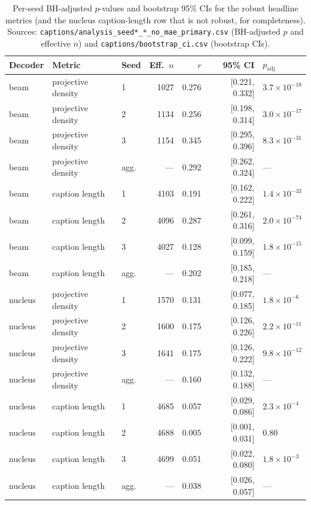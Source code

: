 \documentclass[11pt]{article}
\newcommand{\code}[1]{\texttt{#1}}
\begin{document}
\begin{table}[H]
\centering
\caption{Per-seed BH-adjusted \(p\)-values and bootstrap 95\% CIs for the
robust headline metrics (and the nucleus caption-length row that is not
robust, for completeness). Sources:
\code{captions/analysis\_seed*\_*\_no\_mae\_primary.csv} (BH-adjusted \(p\)
and effective \(n\)) and \code{captions/bootstrap\_ci.csv} (bootstrap CIs).}
\label{tab:per-seed-detail}
\footnotesize
\begin{tabular}{@{}l l l r r r l@{}}
\toprule
Decoder & Metric & Seed & Eff.\ \(n\) & \(r\) & 95\% CI & \(p_{\text{adj}}\) \\
\midrule
beam & projective density & 1 & 1027 & 0.276 & [0.221, 0.332] & \(3.7\!\times\!10^{-18}\) \\
beam & projective density & 2 & 1134 & 0.256 & [0.198, 0.314] & \(3.0\!\times\!10^{-17}\) \\
beam & projective density & 3 & 1154 & 0.345 & [0.295, 0.396] & \(8.3\!\times\!10^{-31}\) \\
beam & projective density & agg. & --- & 0.292 & [0.262, 0.324] & --- \\
\midrule
beam & caption length & 1 & 4103 & 0.191 & [0.162, 0.222] & \(1.4\!\times\!10^{-33}\) \\
beam & caption length & 2 & 4096 & 0.287 & [0.261, 0.316] & \(2.0\!\times\!10^{-74}\) \\
beam & caption length & 3 & 4027 & 0.128 & [0.099, 0.159] & \(1.8\!\times\!10^{-15}\) \\
beam & caption length & agg. & --- & 0.202 & [0.185, 0.218] & --- \\
\midrule
nucleus & projective density & 1 & 1570 & 0.131 & [0.077, 0.185] & \(1.8\!\times\!10^{-6}\) \\
nucleus & projective density & 2 & 1600 & 0.175 & [0.126, 0.226] & \(2.2\!\times\!10^{-11}\) \\
nucleus & projective density & 3 & 1641 & 0.175 & [0.126, 0.222] & \(9.8\!\times\!10^{-12}\) \\
nucleus & projective density & agg. & --- & 0.160 & [0.132, 0.188] & --- \\
\midrule
nucleus & caption length & 1 & 4685 & 0.057 & [0.029, 0.086] & \(2.3\!\times\!10^{-4}\) \\
nucleus & caption length & 2 & 4688 & 0.005 & [0.001, 0.031] & 0.80 \\
nucleus & caption length & 3 & 4699 & 0.051 & [0.022, 0.080] & \(1.8\!\times\!10^{-3}\) \\
nucleus & caption length & agg. & --- & 0.038 & [0.026, 0.057] & --- \\
\bottomrule
\end{tabular}
\end{table}
\end{document}
